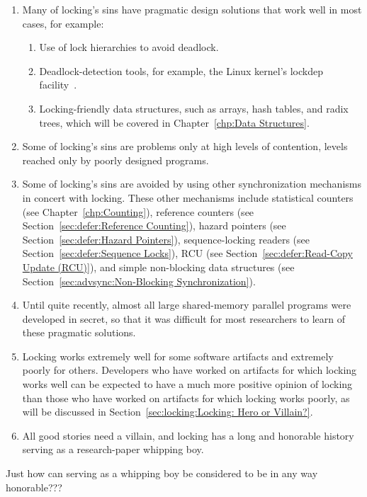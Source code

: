 \begin{enumerate}
\item	Many of locking's sins have pragmatic design solutions that
	work well in most cases, for example:
	\begin{enumerate}
	\item	Use of lock hierarchies to avoid deadlock.
	\item	Deadlock-detection tools, for example, the Linux kernel's
		lockdep facility~\cite{JonathanCorbet2006lockdep}.
	\item	Locking-friendly data structures, such as
		arrays, hash tables, and radix trees, which will
		be covered in Chapter~\ref{chp:Data Structures}.
	\end{enumerate}
\item	Some of locking's sins are problems only at high levels of
	contention, levels reached only by poorly designed programs.
\item	Some of locking's sins are avoided by using other synchronization
	mechanisms in concert with locking.
	These other mechanisms include
	statistical counters
	(see Chapter~\ref{chp:Counting}),
	reference counters
	(see Section~\ref{sec:defer:Reference Counting}),
	hazard pointers
	(see Section~\ref{sec:defer:Hazard Pointers}),
	sequence-locking readers
	(see Section~\ref{sec:defer:Sequence Locks}),
	RCU
	(see Section~\ref{sec:defer:Read-Copy Update (RCU)}),
	and simple non-blocking data structures
	(see Section~\ref{sec:advsync:Non-Blocking Synchronization}).
\item	Until quite recently, almost all large shared-memory parallel
	programs were developed in secret, so that it was difficult for
	most researchers to learn of these pragmatic solutions.
\item	Locking works extremely well for some software artifacts
	and extremely poorly for others.
	Developers who have worked on artifacts for which locking
	works well can be expected to have a much more positive
	opinion of locking than those who have worked on artifacts
	for which locking works poorly, as will be discussed in
	Section~\ref{sec:locking:Locking: Hero or Villain?}.
\item	All good stories need a villain, and locking has a long and
	honorable history serving as a research-paper whipping boy.
\end{enumerate}

\QuickQuiz{}
	Just how can serving as a whipping boy be considered to be
	in any way honorable???
 \QuickQuizEnd

